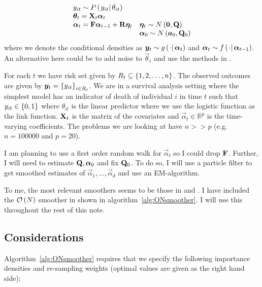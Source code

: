 \begin{equation}
\begin{array}{ll}
 	y_{it} \sim \propC{y_{it}}{\theta_{it}} & \\
%
 	\vec{\theta}_{t} = \mat{X}_t\vec{\alpha}_t \\
% 
 	\vec{\alpha}_t = \mat{F}\vec{\alpha}_{t - 1} + \mat{R}\vec{\eta}_t &
 		\vec{\eta}_t \sim N\Lparen{\vec{0}, \mat{Q}} \\
%
	&	\vec{\alpha}_0 \sim N\Lparen{\vec{a}_0, \mat{Q}_0}
 \end{array}
\end{equation}%
%
where we denote the conditional densities as $\vec{y}_t \sim \optorC{g}{\cdot}{\vec{\alpha}_t}$ and $\vec{\alpha}_t \sim \optorC{f}{\cdot}{\vec{\alpha}_{t-1}}$. An alternative here could be to add noise to $\vec{\theta}_{t}$ and use the methods in \cite{andrieu02}.

For each $t$ we have risk set given by $R_t \subseteq \left\{ 1,2,\dots,n\right\}$. The observed outcomes are given by $\bm{y}_t = \left\{ y_{it}\right\}_{i \in R_t}$. We are in a survival analysis setting where the simplest model has an indicator of death of individual $i$ in time $t$ such that $y_{it} \in \left\{ 0, 1\right\}$ where $\theta_{it}$ is the linear predictor where we use the logistic function as the link function. $\mathbf{X}_t$ is the matrix of the covariates and $\vec{\alpha}_t \in \mathbb{R}^p$ is the time-varying coefficients. The problems we are looking at have $n >> p$ (e.g. $n = 100000$ and $p = 20$). 

 I am planning to use a first order random walk for $\vec{\alpha}_t$ so I could drop $\mathbf{F}$. Further, I will need to estimate $\mathbf{Q}, \bm{\alpha}_0$ and fix $\mathbf{Q}_0$. To do so, I will use a particle filter to get smoothed estimates of $\vec{\alpha}_1, \dots, \vec{\alpha}_d$ and use an EM-algorithm.

To me, the most relevant smoothers seems to be those in \cite{fearnhead10} and \cite{briers10}. I have included the $\mathcal{O}\left( N\right)$ smoother in \cite{fearnhead10} shown in algorithm~\ref{alg:ONsmoother}. I will use this throughout the rest of this note.



\subsection*{Considerations}
Algorithm~\ref{alg:ONsmoother} requires that we specify the following importance densities and re-sampling weights (optimal values are given as the right hand side):

